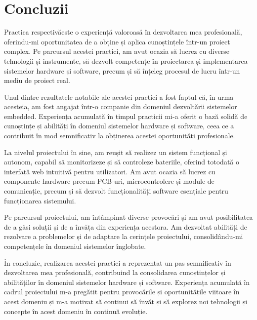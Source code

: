 \clearpage
\section*{Concluzii}

Practica respectivăeste o experiență valoroasă în dezvoltarea mea profesională, oferindu-mi oportunitatea de a obține și aplica cunoștințele într-un proiect complex. Pe parcursul acestei practici, am avut ocazia să lucrez cu diverse tehnologii și instrumente, să dezvolt competențe în proiectarea și implementarea sistemelor hardware și software, precum și să înțeleg procesul de lucru într-un mediu de proiect real.

Unul dintre rezultatele notabile ale acestei practici a fost faptul că, în urma acesteia, am fost angajat într-o companie din domeniul dezvoltării sistemelor embedded. Experiența acumulată în timpul practicii mi-a oferit o bază solidă de cunoștințe și abilități în domeniul sistemelor hardware și software, ceea ce a contribuit în mod semnificativ la obținerea acestei oportunități profesionale.

La nivelul proiectului în sine, am reușit să realizez un sistem funcțional și autonom, capabil să monitorizeze și să controleze bateriile, oferind totodată o interfață web intuitivă pentru utilizatori. Am avut ocazia să lucrez cu componente hardware precum PCB-uri, microcontrolere și module de comunicație, precum și să dezvolt funcționalități software esențiale pentru funcționarea sistemului.

Pe parcursul proiectului, am întâmpinat diverse provocări și am avut posibilitatea de a găsi soluții și de a învăța din experiența acestora. Am dezvoltat abilități de rezolvare a problemelor și de adaptare la cerințele proiectului, consolidându-mi competențele în domeniul sistemelor înglobate.

În concluzie, realizarea acestei practici a reprezentat un pas semnificativ în dezvoltarea mea profesională, contribuind la consolidarea cunoștințelor și abilităților în domeniul sistemelor hardware și software. Experiența acumulată în cadrul proiectului m-a pregătit pentru provocările și oportunitățile viitoare în acest domeniu și m-a motivat să continui să învăț și să explorez noi tehnologii și concepte în acest domeniu în continuă evoluție.